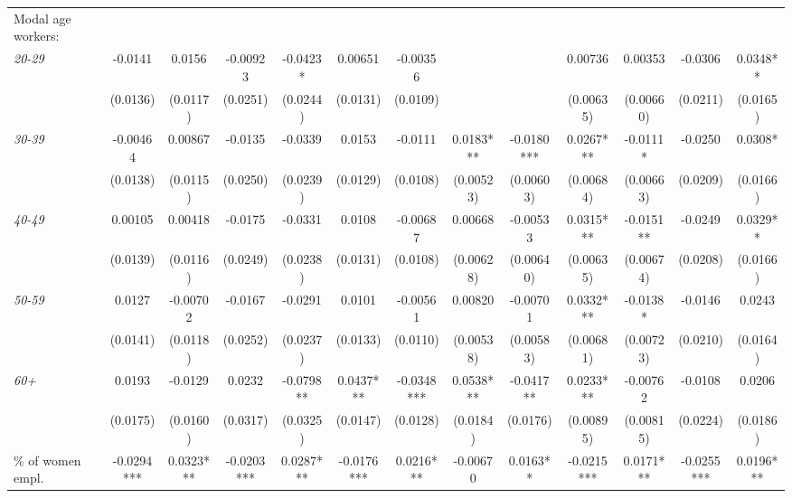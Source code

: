 \begin{threeparttable}
\begin{tabular}{l*{12}{S}}
Modal age workers:        \\[1ex]
\quad \textit{20-29}      &  -0.0141     & 0.0156      & -0.00923     & -0.0423*   & 0.00651    & -0.00356    &             &            & 0.00736    & 0.00353    & -0.0306      & 0.0348**   \\
                          &  (0.0136)    & (0.0117)    & (0.0251)     & (0.0244)   & (0.0131)   & (0.0109)    &             &            & (0.00635)  & (0.00660)  & (0.0211)     & (0.0165)   \\[1ex]
\quad \textit{30-39}      &  -0.00464    & 0.00867     & -0.0135      & -0.0339    & 0.0153     & -0.0111     & 0.0183***   & -0.0180*** & 0.0267***  & -0.0111*   & -0.0250      & 0.0308*    \\
                          &  (0.0138)    & (0.0115)    & (0.0250)     & (0.0239)   & (0.0129)   & (0.0108)    & (0.00523)   & (0.00603)  & (0.00684)  & (0.00663)  & (0.0209)     & (0.0166)   \\[1ex]
\quad \textit{40-49}      &  0.00105     & 0.00418     & -0.0175      & -0.0331    & 0.0108     & -0.00687    & 0.00668     & -0.00533   & 0.0315***  & -0.0151**  & -0.0249      & 0.0329**   \\
                          &  (0.0139)    & (0.0116)    & (0.0249)     & (0.0238)   & (0.0131)   & (0.0108)    & (0.00628)   & (0.00640)  & (0.00635)  & (0.00674)  & (0.0208)     & (0.0166)   \\[1ex]
\quad \textit{50-59}      &  0.0127      & -0.00702    & -0.0167      & -0.0291    & 0.0101     & -0.00561    & 0.00820     & -0.00701   & 0.0332***  & -0.0138*   & -0.0146      & 0.0243     \\
                          &  (0.0141)    & (0.0118)    & (0.0252)     & (0.0237)   & (0.0133)   & (0.0110)    & (0.00538)   & (0.00583)  & (0.00681)  & (0.00723)  & (0.0210)     & (0.0164)   \\[1ex]
\quad \textit{60+}        &  0.0193      & -0.0129     & 0.0232       & -0.0798**  & 0.0437***  & -0.0348***  & 0.0538***   & -0.0417**  & 0.0233***  & -0.00762   & -0.0108      & 0.0206     \\
                          &  (0.0175)    & (0.0160)    & (0.0317)     & (0.0325)   & (0.0147)   & (0.0128)    & (0.0184)    & (0.0176)   & (0.00895)  & (0.00815)  & (0.0224)     & (0.0186)   \\[1ex]
\% of women empl.         &  -0.0294***  & 0.0323***   & -0.0203***   & 0.0287***  & -0.0176*** & 0.0216***   & -0.00670    & 0.0163**   & -0.0215*** & 0.0171***  & -0.0255***   & 0.0196***  \\

\end{tabular}
\end{threeparttable}
